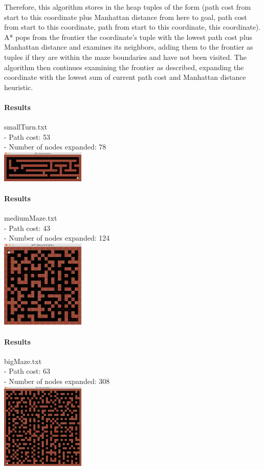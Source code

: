 \begin{multicols*}{2}
Therefore, this algorithm stores in the heap tuples of the form (path cost from start to this coordinate plus Manhattan distance from here to goal, path cost from start to this coordinate, path from start to this coordinate, this coordinate). A* pops from the frontier the coordinate's tuple with the lowest path cost plus Manhattan distance and examines its neighbors, adding them to the frontier as tuples if they are within the maze boundaries and have not been visited. The algorithm then continues examining the frontier as described, expanding the coordinate with the lowest sum of current path cost and Manhattan distance heuristic.

\paragraph{Results}
smallTurn.txt\\
- Path cost: 53\\
- Number of nodes expanded: 78\\
\includegraphics[width=0.3\textwidth]{graphics/smallTurn_astar.png}

\paragraph{Results}
mediumMaze.txt\\
- Path cost: 43\\
- Number of nodes expanded: 124\\
\includegraphics[width=0.3\textwidth]{graphics/mediumMaze_astar.png}

\paragraph{Results}
bigMaze.txt\\
- Path cost: 63\\
- Number of nodes expanded: 308\\
\includegraphics[width=0.3\textwidth]{graphics/bigMaze_astar.png}


\end{multicols*}
